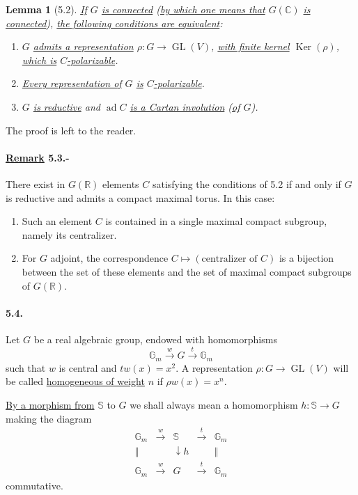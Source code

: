 \documentclass[10pt,leqno]{article}
\newcommand{\C}{\mathbb C}
\newcommand{\R}{\mathbb R}
\newcommand{\bS}{\mathbb S}
\newcommand{\Ker}{\operatorname{Ker}}
\theoremstyle{deligne}
\newtheorem*{lemma}{Lemma}
\newcommand{\ad}{\operatorname{ad}}
\newcommand{\GL}{\operatorname{GL}}
\renewcommand{\underline}[1]{\uline{#1}}
\begin{document}
\begin{lemma}[5.2]
\underline{If} $G$ \underline{is connected} (\underline{by which one means that} $G(\C)$ \underline{is connected}), \underline{the following conditions are equivalent}:
\begin{enumerate}[label=(\roman*)]
\item $G$ \underline{admits a representation} $\rho:G\to \GL(V)$, \underline{with finite kernel} $\Ker(\rho)$, \underline{which is} $C$\underline{-polarizable}.
\item \underline{Every representation of} $G$ \underline{is} $C$\underline{-polarizable}.
\item $G$ \underline{is reductive} and $\ad C$ \underline{is a Cartan involution} (\underline{of} $G$).
\end{enumerate}
\end{lemma}

The proof is left to the reader.

\paragraph{\underline{Remark} 5.3.-}
There exist in $G(\R)$ elements $C$ satisfying the conditions of 5.2 if and only if $G$ is reductive and admits a compact maximal torus. In this case:
\begin{enumerate}[label=\alph*)]
\item Such an element $C$ is contained in a single maximal compact subgroup, namely its centralizer.
\item For $G$ adjoint, the correspondence $C\longmapsto (\text{centralizer of }C)$ is a bijection between the set of these elements and the set of maximal compact subgroups of $G(\R)$.
\end{enumerate}

\paragraph{5.4.}
Let $G$ be a real algebraic group, endowed with homomorphisms
\[
\tag{5.4.1}
 \mathbb G_m \xrightarrow{w} G \xrightarrow{t} \mathbb G_m
\]
such that $w$ is central and $tw(x)=x^2$. A representation $\rho:G\to\GL(V)$ will be called \underline{homogeneous of weight} $n$ if $\rho w(x)=x^n$.

\underline{By a morphism from} $\bS$ to $G$ we shall always mean a homomorphism $h:\bS\to G$ making the diagram
\[
\begin{array}{ccccc}
\mathbb G_m&\xrightarrow{w}&\bS&\xrightarrow{t}&\mathbb G_m\\
\Vert&&\downarrow h&&\Vert\\
\mathbb G_m&\xrightarrow{w}&G&\xrightarrow{t}&\mathbb G_m
\end{array}
\]
commutative.
\end{document}
